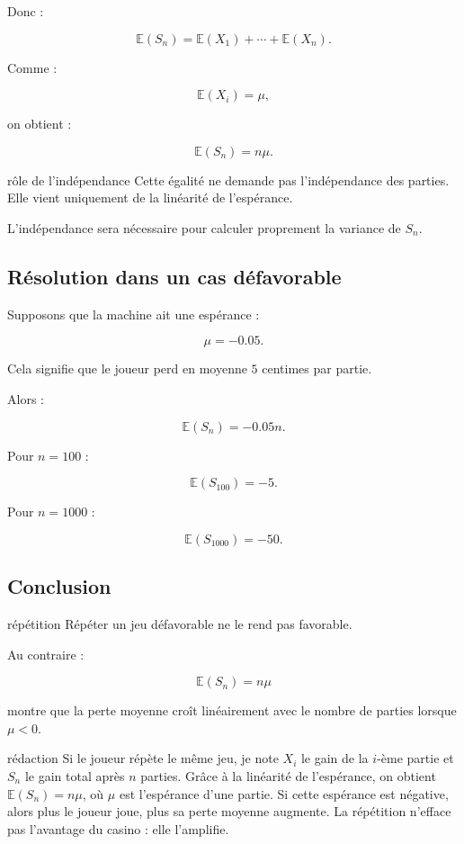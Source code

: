 \documentclass[11pt,a4paper]{article}
\newcommand{\E}{\mathbb{E}}
\begin{document}
Donc :

\[
\E(S_n)=\E(X_1)+\cdots+\E(X_n).
\]

Comme :

\[
\E(X_i)=\mu,
\]

on obtient :

\[
\E(S_n)=n\mu.
\]

\begin{attention}{rôle de l'indépendance}
Cette égalité ne demande pas l'indépendance des parties. Elle vient uniquement de la linéarité de l'espérance.

L'indépendance sera nécessaire pour calculer proprement la variance de $S_n$.
\end{attention}

\subsection{Résolution dans un cas défavorable}

Supposons que la machine ait une espérance :

\[
\mu=-0.05.
\]

Cela signifie que le joueur perd en moyenne $5$ centimes par partie.

Alors :

\[
\E(S_n)=-0.05n.
\]

Pour $n=100$ :

\[
\E(S_{100})=-5.
\]

Pour $n=1000$ :

\[
\E(S_{1000})=-50.
\]

\subsection{Conclusion}

\begin{conclusionbox}{répétition}
Répéter un jeu défavorable ne le rend pas favorable.

Au contraire :

\[
\E(S_n)=n\mu
\]

montre que la perte moyenne croît linéairement avec le nombre de parties lorsque $\mu<0$.
\end{conclusionbox}

\begin{oral}{rédaction}
Si le joueur répète le même jeu, je note $X_i$ le gain de la $i$-ème partie et $S_n$ le gain total après $n$ parties. Grâce à la linéarité de l'espérance, on obtient $\E(S_n)=n\mu$, où $\mu$ est l'espérance d'une partie. Si cette espérance est négative, alors plus le joueur joue, plus sa perte moyenne augmente. La répétition n'efface pas l'avantage du casino : elle l'amplifie.
\end{oral}
\end{document}
